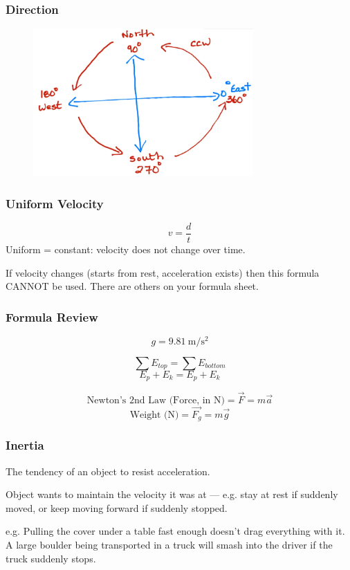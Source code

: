 \documentclass[a4paper,12pt]{article}
\begin{document}
\subsubsection{Direction}
\begin{figure}[H]
    \includegraphics[width=0.75\textwidth]{direction}
\end{figure}

\subsubsection{Uniform Velocity}
$$v = \frac{d}{t}$$
Uniform = constant: velocity does not change over time.

If velocity changes (starts from rest, acceleration exists) then this formula CANNOT be used. There are others on your formula sheet.

\subsubsection{Formula Review}
$$g = \SI{9.81}{\m/\s^2}$$

$$\sum{E_{top}} = \sum{E_{bottom}}$$
$$E_p + E_k = E_p + E_k$$

$$\textrm{Newton's 2nd Law (Force, in N)} = \vec{F} = m\vec{a}$$
$$\textrm{Weight (N)} = \vec{F_g} = m\vec{g}$$

\subsubsection{Inertia}
The tendency of an object to resist acceleration.

Object wants to maintain the velocity it was at --- e.g. stay at rest if suddenly moved, or keep moving forward if suddenly stopped.

e.g. Pulling the cover under a table fast enough doesn't drag everything with it. A large boulder being transported in a truck will smash into the driver if the truck suddenly stops.
\end{document}
